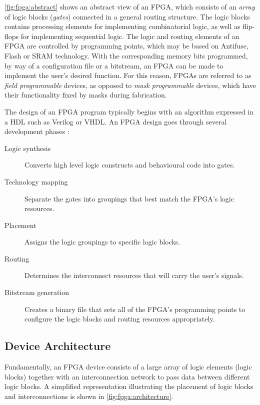 \autoref{fig:fpga:abstract} shows an abstract view of an \gls{FPGA}, which
consists of an \emph{array} of logic blocks (\emph{gates}) connected in a
general routing structure. The logic blocks contains processing elements for
implementing combinatorial logic, as well as flip-flops for implementing
sequential logic. The logic and routing elements of an \gls{FPGA} are controlled
by programming points, which may be based on Antifuse, Flash or \gls{SRAM}
technology. With the corresponding memory bits programmed, by way of a
configuration file or a bitstream, an \gls{FPGA} can be made to implement the
user's desired function. For this reason, \glspl{FPGA} are referred to as
\emph{field programmable} devices, as opposed to \emph{mask programmable}
devices, which have their  functionality fixed by masks during fabrication.

The design of an \gls{FPGA} program typically begins with an algorithm expressed
in a \gls{HDL} such as Verilog or \gls{VHDL}. An \gls{FPGA} design goes through
several development phases \cite{Hauck:2007}:
\begin{description}
    \item[Logic synthesis] Converts high level logic constructs and behavioural
        code into gates.
    \item[Technology mapping] Separate the gates into groupings that best match
        the \gls{FPGA}'s logic resources.
    \item[Placement] Assigns the logic groupings to specific logic blocks.
    \item[Routing] Determines the interconnect resources that will carry the
        user's signals.
    \item[Bitstream generation] Creates a binary file that sets all of the
        \gls{FPGA}'s programming points to configure the logic blocks and
        routing resources appropriately.
\end{description}

\subsection{Device Architecture}
\label{fpga:architecture}
Fundamentally, an \gls{FPGA} device consists of a large array of logic elements
(logic blocks) together with an interconnection network to pass data between
different logic blocks. A simplified representation illustrating the placement
of logic blocks and interconnections is shown in
\autoref{fig:fpga:architecture}.

